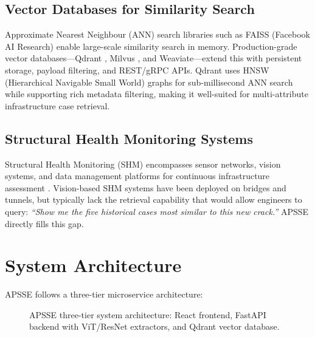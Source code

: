 \documentclass[conference]{IEEEtran}
\begin{document}
\subsection{Vector Databases for Similarity Search}

Approximate Nearest Neighbour (ANN) search libraries such as FAISS \cite{ref_faiss} (Facebook AI Research) enable large-scale similarity search in memory. Production-grade vector databases---Qdrant \cite{ref_qdrant}, Milvus \cite{ref_milvus}, and Weaviate---extend this with persistent storage, payload filtering, and REST/gRPC APIs. Qdrant uses HNSW (Hierarchical Navigable Small World) graphs for sub-millisecond ANN search while supporting rich metadata filtering, making it well-suited for multi-attribute infrastructure case retrieval.

\subsection{Structural Health Monitoring Systems}

Structural Health Monitoring (SHM) encompasses sensor networks, vision systems, and data management platforms for continuous infrastructure assessment \cite{ref_shm}. Vision-based SHM systems have been deployed on bridges and tunnels, but typically lack the retrieval capability that would allow engineers to query: \textit{``Show me the five historical cases most similar to this new crack.''} APSSE directly fills this gap.

\section{System Architecture}

APSSE follows a three-tier microservice architecture:

\begin{figure}[H]
  \centering
  \caption{APSSE three-tier system architecture: React frontend, FastAPI backend with ViT/ResNet extractors, and Qdrant vector database.}
  \label{fig:architecture}
\end{figure}
\end{document}
